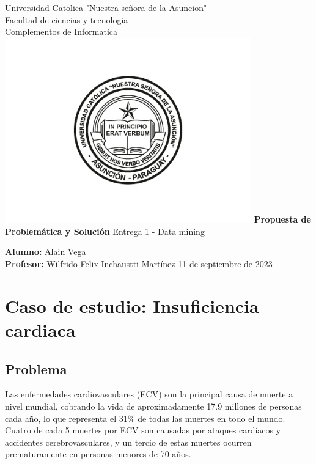\documentclass[12pt, letterpaper, spanish]{article}
\begin{document}
\begin{titlepage}
  \begin{center}
      \Large{Universidad Catolica "Nuestra señora de la Asuncion" \\
      Facultad de ciencias y tecnologia \\
      Complementos de Informatica}
      \includegraphics[width=0.8\textwidth]{UcaLogo.jpg}
      \LARGE{\textbf{Propuesta de Problemática y Solución}}
      \Large{Entrega 1 - Data mining}
      \vspace{1cm}
  \end{center}
      \large
      \textbf{Alumno: }Alain Vega \\
      \textbf{Profesor: }Wilfrido Felix Inchaustti Martínez
      \vfill
      \hfill{11 de septiembre de 2023}
\end{titlepage}

\newpage
\tableofcontents %
\newpage

\section{Caso de estudio: Insuficiencia cardiaca}
\subsection{Problema}
Las enfermedades cardiovasculares (ECV) son la principal causa de muerte a nivel mundial, 
cobrando la vida de aproximadamente 17.9 millones de personas cada año, 
lo que representa el 31\% de todas las muertes en todo el mundo. 
Cuatro de cada 5 muertes por ECV son causadas por ataques cardíacos y accidentes cerebrovasculares, 
y un tercio de estas muertes ocurren prematuramente en personas menores de 70 años. 
\end{document}
